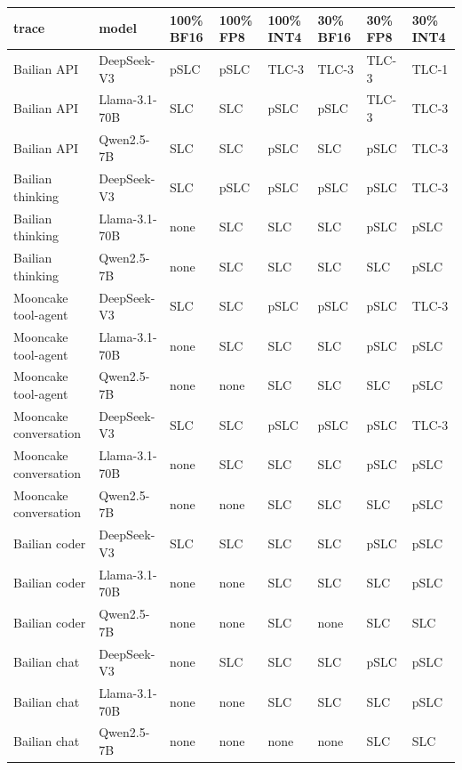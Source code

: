 \begin{tabular}{llllllll}
\toprule
trace & model & 100\% BF16 & 100\% FP8 & 100\% INT4 & 30\% BF16 & 30\% FP8 & 30\% INT4 \\
\midrule
Bailian API & DeepSeek-V3 & pSLC & pSLC & TLC-3 & TLC-3 & TLC-3 & TLC-1 \\
Bailian API & Llama-3.1-70B & SLC & SLC & pSLC & pSLC & TLC-3 & TLC-3 \\
Bailian API & Qwen2.5-7B & SLC & SLC & pSLC & SLC & pSLC & TLC-3 \\
Bailian thinking & DeepSeek-V3 & SLC & pSLC & pSLC & pSLC & pSLC & TLC-3 \\
Bailian thinking & Llama-3.1-70B & none & SLC & SLC & SLC & pSLC & pSLC \\
Bailian thinking & Qwen2.5-7B & none & SLC & SLC & SLC & SLC & pSLC \\
Mooncake tool-agent & DeepSeek-V3 & SLC & SLC & pSLC & pSLC & pSLC & TLC-3 \\
Mooncake tool-agent & Llama-3.1-70B & none & SLC & SLC & SLC & pSLC & pSLC \\
Mooncake tool-agent & Qwen2.5-7B & none & none & SLC & SLC & SLC & pSLC \\
Mooncake conversation & DeepSeek-V3 & SLC & SLC & pSLC & pSLC & pSLC & TLC-3 \\
Mooncake conversation & Llama-3.1-70B & none & SLC & SLC & SLC & pSLC & pSLC \\
Mooncake conversation & Qwen2.5-7B & none & none & SLC & SLC & SLC & pSLC \\
Bailian coder & DeepSeek-V3 & SLC & SLC & SLC & SLC & pSLC & pSLC \\
Bailian coder & Llama-3.1-70B & none & none & SLC & SLC & SLC & pSLC \\
Bailian coder & Qwen2.5-7B & none & none & SLC & none & SLC & SLC \\
Bailian chat & DeepSeek-V3 & none & SLC & SLC & SLC & pSLC & pSLC \\
Bailian chat & Llama-3.1-70B & none & none & SLC & SLC & SLC & pSLC \\
Bailian chat & Qwen2.5-7B & none & none & none & none & SLC & SLC \\
\bottomrule
\end{tabular}

